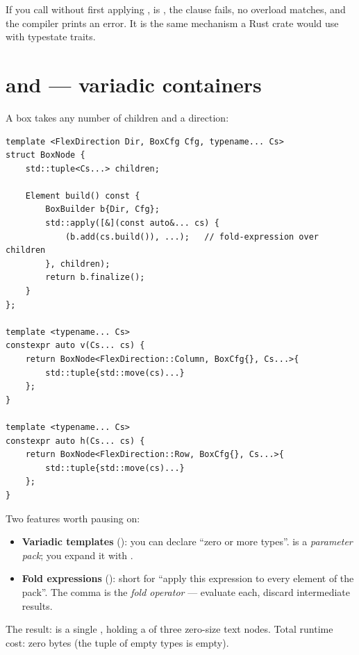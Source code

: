If you call  without first applying
,  is , the
 clause fails, no overload matches, and the compiler
prints an error. It is the same mechanism a Rust crate would use with
typestate traits.

\section{ and  --- variadic containers}

A box takes any number of children and a direction:

\begin{lstlisting}
template <FlexDirection Dir, BoxCfg Cfg, typename... Cs>
struct BoxNode {
    std::tuple<Cs...> children;

    Element build() const {
        BoxBuilder b{Dir, Cfg};
        std::apply([&](const auto&... cs) {
            (b.add(cs.build()), ...);   // fold-expression over children
        }, children);
        return b.finalize();
    }
};

template <typename... Cs>
constexpr auto v(Cs... cs) {
    return BoxNode<FlexDirection::Column, BoxCfg{}, Cs...>{
        std::tuple{std::move(cs)...}
    };
}

template <typename... Cs>
constexpr auto h(Cs... cs) {
    return BoxNode<FlexDirection::Row, BoxCfg{}, Cs...>{
        std::tuple{std::move(cs)...}
    };
}
\end{lstlisting}

Two \cpp{} features worth pausing on:

\begin{itemize}[leftmargin=*]
  \item \textbf{Variadic templates} (): you can
    declare ``zero or more types''.  is a \emph{parameter
    pack}; you expand it with .
  \item \textbf{Fold expressions} ():
    short for ``apply this expression to every element of the
    pack''. The comma is the \emph{fold operator} --- evaluate each,
    discard intermediate results.
\end{itemize}

The result:  is a single
, holding a  of three zero-size text
nodes. Total runtime cost: zero bytes (the tuple of empty types is
empty).

